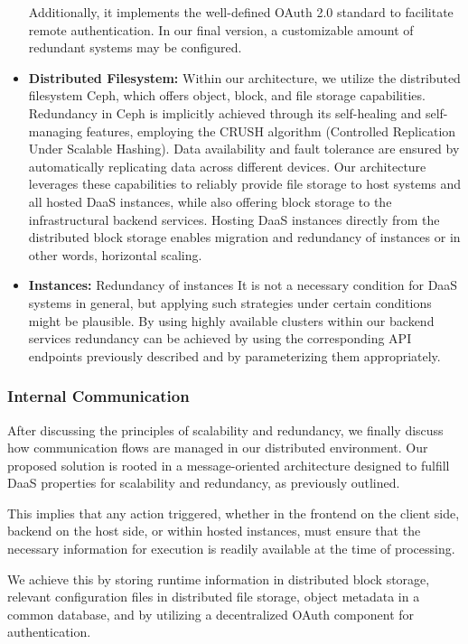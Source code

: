 \documentclass[runningheads]{llncs}
\begin{document}
\begin{itemize}
	      Additionally, it implements the well-defined OAuth 2.0 standard
	      to facilitate remote authentication.
	      In our final version,
	      a customizable amount of redundant systems may be configured.
	\item \textbf{Distributed Filesystem:}
	      Within our architecture, we utilize the distributed filesystem Ceph,
	      which offers object, block, and file storage capabilities.
	      Redundancy in Ceph is implicitly achieved
	      through its self-healing and self-managing features, employing
	      the CRUSH algorithm (Controlled Replication Under Scalable Hashing).
	      Data availability and fault tolerance are ensured
	      by automatically replicating data across different devices.
	      Our architecture leverages these capabilities
	      to reliably provide file storage to host systems
	      and all hosted DaaS instances,
	      while also offering block storage to the infrastructural backend services.
	      Hosting DaaS instances directly from the distributed block storage
	      enables migration and redundancy of instances or in other words, horizontal scaling.
	\item \textbf{Instances:} Redundancy of instances
	      It is not a necessary condition for DaaS systems in general,
	      but applying such strategies under certain conditions might be plausible.
	      By using highly available clusters within our backend services
	      redundancy can be achieved by using the corresponding API endpoints
	      previously described and by parameterizing them appropriately.
\end{itemize}

\subsubsection{Internal Communication}
After discussing the principles of scalability and redundancy,
we finally discuss how communication flows are managed in our distributed environment.
Our proposed solution is rooted in a message-oriented architecture
designed to fulfill DaaS properties for scalability and redundancy,
as previously outlined.

This implies that any action triggered, whether in the frontend on the client side,
backend on the host side, or within hosted instances,
must ensure that the necessary information for execution
is readily available at the time of processing.

We achieve this by storing runtime information in distributed block storage,
relevant configuration files in distributed file storage,
object metadata in a common database,
and by utilizing a decentralized OAuth component for authentication.
\end{document}
